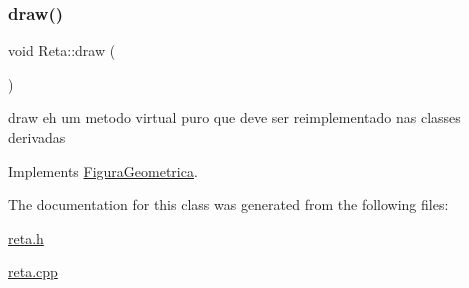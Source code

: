 \subsubsection{\texorpdfstring{draw()}{draw()}}
{\footnotesize\ttfamily void Reta\+::draw (\begin{DoxyParamCaption}{ }\end{DoxyParamCaption})\hspace{0.3cm}{\ttfamily [virtual]}}



draw eh um metodo virtual puro que deve ser reimplementado nas classes derivadas 



Implements \hyperlink{class_figura_geometrica_a727cea2befcb22b2457c088127fe041d}{Figura\+Geometrica}.



The documentation for this class was generated from the following files\+:\begin{DoxyCompactItemize}
\item 
\hyperlink{reta_8h}{reta.\+h}\item 
\hyperlink{reta_8cpp}{reta.\+cpp}\end{DoxyCompactItemize}
